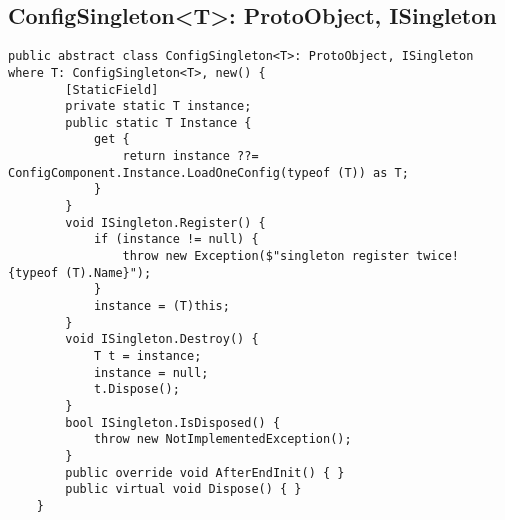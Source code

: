 \documentclass[9pt, b5paper]{article}
\begin{document}
\subsection{ConfigSingleton<T>: ProtoObject, ISingleton}
\label{sec-2-1}
\begin{verbatim}
public abstract class ConfigSingleton<T>: ProtoObject, ISingleton where T: ConfigSingleton<T>, new() {
        [StaticField]
        private static T instance;
        public static T Instance {
            get {
                return instance ??= ConfigComponent.Instance.LoadOneConfig(typeof (T)) as T;
            }
        }
        void ISingleton.Register() {
            if (instance != null) {
                throw new Exception($"singleton register twice! {typeof (T).Name}");
            }
            instance = (T)this;
        }
        void ISingleton.Destroy() {
            T t = instance;
            instance = null;
            t.Dispose();
        }
        bool ISingleton.IsDisposed() {
            throw new NotImplementedException();
        }
        public override void AfterEndInit() { }
        public virtual void Dispose() { }
    }
\end{verbatim}
\end{document}
